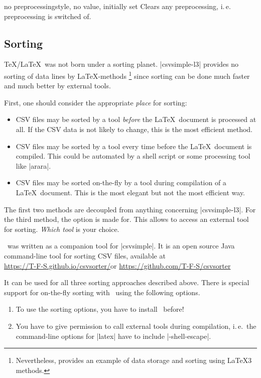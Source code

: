 \documentclass[a4paper,11pt]{ltxdoc}
\begin{document}
\begin{docCsvKey}{no preprocessing}{}{style, no value, initially set}
  Clears any preprocessing, i.\,e. preprocessing is switched of.
\end{docCsvKey}



\clearpage
\subsection{Sorting}\label{sec:Sorting}%
\TeX/\LaTeX\ was not born under a sorting planet. |csvsimple-l3| provides no
sorting of data lines by \LaTeX-methods%
\footnote{%
  Nevertheless,  provides an example of data storage and sorting using \LaTeX3 methods.%
}
since sorting can be done much faster
and much better by external
tools.

First, one should consider the appropriate \emph{place} for sorting:
\begin{itemize}
\item CSV files may be sorted by a tool \emph{before} the \LaTeX\ document is processed
  at all. If the CSV data is not likely to change, this is the most efficient method.
\item CSV files may be sorted by a tool every time before the \LaTeX\ document is compiled.
  This could be automated by a shell script or some processing tool like |arara|.
\item CSV files may be sorted on-the-fly by a tool during compilation of
  a \LaTeX\ document. This is the most elegant but not the most efficient way.
\end{itemize}

The first two methods are decoupled from anything concerning |csvsimple-l3|.
For the third method, the  option is made for.
This allows to access an external tool for sorting.
\emph{Which tool} is your choice.

\csvsorter\ was written as a companion tool for |csvsimple|.
It is an open source Java command-line tool for sorting CSV files, available at\\
\url{https://T-F-S.github.io/csvsorter/}\quad or\quad
\url{https://github.com/T-F-S/csvsorter}

It can be
used for all three sorting approaches described above.
There is special support for on-the-fly sorting with \csvsorter\ using the
following options.

\begin{enumerate}\bfseries
\item To use the sorting options, you have to install \csvsorter\ before!
\item You have to give permission to call external tools during
  compilation, i.\,e.\ the command-line options for |latex| have to include
  |-shell-escape|.
\end{enumerate}
\end{document}

